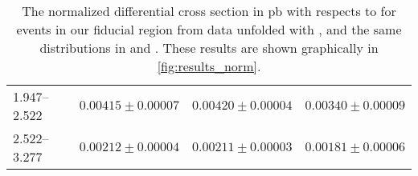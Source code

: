 \begin{table}
\begin{center}
\begin{tabular}{@{}l r r r@{}}
            1.947--2.522  &  $0.00415  \pm  0.00007$  &  $0.00420  \pm  0.00004$  &  $0.00340  \pm  0.00009$  \\
            2.522--3.277  &  $0.00212  \pm  0.00004$  &  $0.00211  \pm  0.00003$  &  $0.00181  \pm  0.00006$  \\
            \bottomrule
        \end{tabular}
    \end{center}
    \caption[
        The normalized differential cross section in \si{\pico\barn} with
        respects to \phistar for \Ztoee events in our fiducial region from data
        unfolded with \MADGRAPH.
    ]{
        The normalized differential cross section in \si{\pico\barn} with
        respects to \phistar for \Ztoee events in our fiducial region from data
        unfolded with \MADGRAPH, and the same distributions in \MADGRAPH and
        \POWHEG. These results are shown graphically in
        \cref{fig:results_norm}.
    }
    \label{tab:results_norm}
\end{table}
